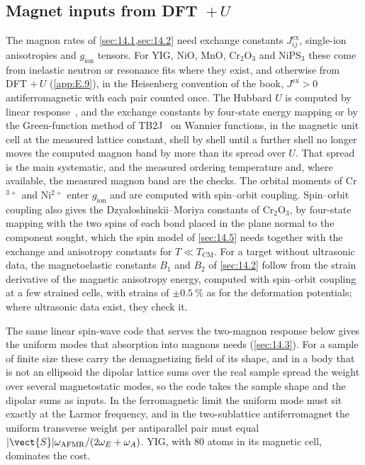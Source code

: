 \subsection{Magnet inputs from DFT~\texorpdfstring{$+\,U$}{+U}}\label{app:E.20-magnet}

The magnon rates of \cref{sec:14.1,sec:14.2} need exchange constants $J^{\mathrm{ex}}_{ij}$, single-ion anisotropies and $g_{\mathrm{ion}}$ tensors. For YIG, NiO, MnO, Cr$_2$O$_3$ and NiPS$_3$ these come from inelastic neutron or resonance fits where they exist, and otherwise from DFT $+\,U$ (\cref{app:E.9}), in the Heisenberg convention of the book, $J^{\mathrm{ex}} > 0$ antiferromagnetic with each pair counted once. The Hubbard $U$ is computed by linear response~\cite{timrov2018hubbard}, and the exchange constants by four-state energy mapping or by the Green-function method of TB2J~\cite{he2021tb2j} on Wannier functions, in the magnetic unit cell at the measured lattice constant, shell by shell until a further shell no longer moves the computed magnon band by more than its spread over $U$. That spread is the main systematic, and the measured ordering temperature and, where available, the measured magnon band are the checks. The orbital moments of Cr$^{3+}$ and Ni$^{2+}$ enter $g_{\mathrm{ion}}$ and are computed with spin--orbit coupling. Spin--orbit coupling also gives the Dzyaloshinskii--Moriya constants of Cr$_2$O$_3$, by four-state mapping with the two spins of each bond placed in the plane normal to the component sought, which the spin model of \cref{sec:14.5} needs together with the exchange and anisotropy constants for $T \ll T_{\mathrm{CM}}$. For a target without ultrasonic data, the magnetoelastic constants $B_1$ and $B_2$ of \cref{sec:14.2} follow from the strain derivative of the magnetic anisotropy energy, computed with spin--orbit coupling at a few strained cells, with strains of $\pm\SI{0.5}{\percent}$ as for the deformation potentials; where ultrasonic data exist, they check it.

The same linear spin-wave code that serves the two-magnon response below gives the uniform modes that absorption into magnons needs (\cref{sec:14.3}). For a sample of finite size these carry the demagnetizing field of its shape, and in a body that is not an ellipsoid the dipolar lattice sums over the real sample spread the weight over several magnetostatic modes, so the code takes the sample shape and the dipolar sums as inputs. In the ferromagnetic limit the uniform mode must sit exactly at the Larmor frequency, and in the two-sublattice antiferromagnet the uniform transverse weight per antiparallel pair must equal $|\vect{S}|\omega_{\mathrm{AFMR}}/(2\omega_E + \omega_A)$. YIG, with 80 atoms in its magnetic cell, dominates the cost.

